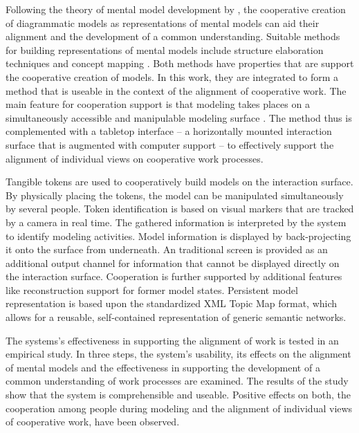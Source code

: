 Following the theory of mental model development by \citep{Seel91}, the cooperative creation of diagrammatic models as representations of mental models can aid their alignment and the development of a common understanding. Suitable methods for building representations of mental models include structure elaboration techniques and concept mapping \citep{Ifenthaler06}. Both methods have properties that are support the cooperative creation of models. In this work, they are integrated to form a method that is useable in the context of the alignment of cooperative work. The main feature for cooperation support is that modeling takes places on a simultaneously accessible and manipulable modeling surface \citep{Dann92}. The method thus is complemented with a tabletop interface -- a horizontally mounted interaction surface that is augmented with computer support -- to effectively support the alignment of individual views on cooperative work processes.

Tangible tokens are used to cooperatively build models on the interaction surface. By physically placing the tokens, the model can be manipulated simultaneously by several people. Token identification is based on visual markers that are tracked by a camera in real time. The gathered information is interpreted by the system to identify modeling activities. Model information is displayed by back-projecting it onto the surface from underneath. An traditional screen is provided as an additional output channel for information  that cannot be displayed directly on the interaction surface. Cooperation is further supported by additional features like reconstruction support for former model states. Persistent model representation is based upon the standardized XML Topic Map format, which allows for a reusable, self-contained representation of generic semantic networks.

The systems's effectiveness in supporting the alignment of work is tested in an empirical study. In three steps, the system's usability, its effects on the alignment of mental models and the effectiveness in supporting the development of a common understanding of work processes are examined. The results of the study show that the system is comprehensible and useable. Positive effects on both, the cooperation among people during modeling and the alignment of individual views of cooperative work, have been observed.
